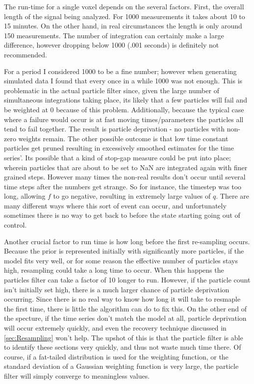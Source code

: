 The run-time for a single voxel depends on the several factors. First, the
overall length of the signal being analyzed. For 1000 measurements it takes
about 10 to 15 minutes. On the other hand, in real circumstances the
length is only around 150 measurements. The number of  integration
can certainly make a large difference, however dropping below 1000 (.001 seconds)
is definitely not recommended. 

For a period I considered 1000 to be a
fine number; however when generating simulated data I found that every once
in a while 1000 was not enough. This is problematic in the actual particle
filter since, given the large number of simultaneous integrations taking 
place, its likely that a few particles will fail and be weighted at 0 because
of this problem. Additionally, because the typical case where a failure would
occur is at fast moving times/parameters the particles all tend to fail together.
The result is particle deprivation - no particles with non-zero weights remain.
The other possible outcome is that low time constant particles get pruned resulting
in excessively smoothed estimates for the time series'. Its possible that a
kind of stop-gap measure could be put into place; wherein particles that are
about to be set to NaN are integrated again with finer grained steps. However
many times the non-real results don't occur until several time steps after the 
numbers get strange. So for instance, the timestep was too long, allowing 
$f$ to go negative, resulting in extremely large values of $q$. There are many
different ways where this sort of event can occur, and unfortunately sometimes
there is no way to get back to before the state starting going out of control.

Another crucial factor to run time is how long before the first re-sampling 
occurs. Because the prior is represented initially with significantly more
particles, if the model fits very well, or for some reason the effective
number of particles stays high, resampling could take a long time to occur.
When this happens the particles filter can take a factor of 10 longer to run.
However, if the particle count isn't initially set high, there is a much larger
chance of particle deprivation occurring. Since there is no real way to know
how long it will take to resmaple the first time, there is little the 
algorithm can do to fix this. On the other end of the specture, if the time
series don't match the model at all, particle deprivation will occur extremely
quickly, and even the recovery technique discussed in \autoref{sec:Resampling}
won't help. The upshot of this is that the particle filter is able to 
identify these sections very quickly, and thus not waste much time there.
Of course, if a fat-tailed distribution is used for the weighting function,
or the standard deviation of a Gaussian weighting function is very large,
the particle filter will simply converge to meaningless values.

